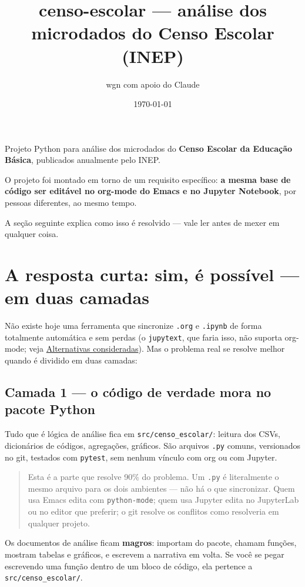 \documentclass[11pt]{article}
\author{wgn com apoio do Claude}
\date{\today}
\title{censo-escolar — análise dos microdados do Censo Escolar (INEP)}
\begin{document}
\maketitle
\setcounter{tocdepth}{2}
\tableofcontents

Projeto Python para análise dos microdados do \textbf{Censo Escolar da Educação
Básica}, publicados anualmente pelo INEP.

O projeto foi montado em torno de um requisito específico: \textbf{a mesma base de
código ser editável no org-mode do Emacs e no Jupyter Notebook}, por
pessoas diferentes, ao mesmo tempo.

A seção seguinte explica como isso é
resolvido — vale ler antes de mexer em qualquer coisa.
\section*{A resposta curta: sim, é possível — em duas camadas}
\label{sec:org6fff1b3}

Não existe hoje uma ferramenta que sincronize \texttt{.org} e \texttt{.ipynb} de forma
totalmente automática e sem perdas (o \texttt{jupytext}, que faria isso, não suporta
org-mode; veja \hyperref[sec:org52b6c48]{Alternativas consideradas}). Mas o problema real
se resolve melhor quando é dividido em duas camadas:
\subsection*{Camada 1 — o código de verdade mora no pacote Python}
\label{sec:orgd419fbf}

Tudo que é lógica de análise fica em \texttt{src/censo\_escolar/}: leitura dos CSVs,
dicionários de códigos, agregações, gráficos. São arquivos \texttt{.py} comuns,
versionados no git, testados com \texttt{pytest}, sem nenhum vínculo com org ou com
Jupyter.

\begin{quote}
Esta é a parte que resolve 90\% do problema. Um \texttt{.py} é literalmente o mesmo
arquivo para os dois ambientes — não há o que sincronizar. Quem usa Emacs edita
com \texttt{python-mode}; quem usa Jupyter edita no JupyterLab ou no editor que
preferir; o git resolve os conflitos como resolveria em qualquer projeto.
\end{quote}

Os documentos de análise ficam \textbf{magros}: importam do pacote, chamam funções,
mostram tabelas e gráficos, e escrevem a narrativa em volta. Se você se pegar
escrevendo uma função dentro de um bloco de código, ela pertence a
\texttt{src/censo\_escolar/}.
\end{document}
